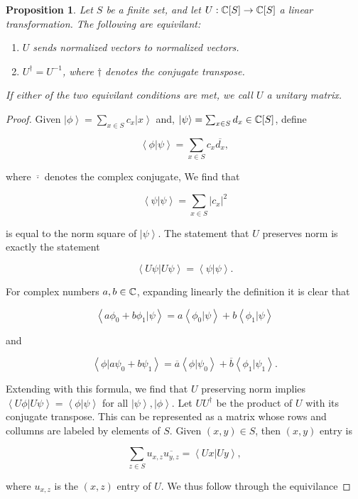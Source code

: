 \documentclass{article}
\newtheorem{proposition}{Proposition}[section]
\theoremstyle{definition}
\numberwithin{figure}{section}
\begin{document}
\begin{proposition}\label{unitary equivilance} Let $S$ be a finite set, and let $U: \mathbb{C}[S]\to \mathbb{C}[S]$ a linear transformation. The following are equivilant:

\begin{enumerate}
\item $U$ sends normalized vectors to normalized vectors.
\item $U^{\dagger}=U^{-1}$, where $\dagger$ denotes the conjugate transpose.
\end{enumerate}

If either of the two equivilant conditions are met, we call $U$ a unitary matrix.
\end{proposition}
\begin{proof} Given $\left|\phi\right>=\sum_{x\in S}c_x\left|x\right>$ and, $\left|\psi\right>=\sum_{x\in S}d_x\in \mathbb{C}[S]$, define

$$\left<\phi|\psi\right>=\sum_{x\in S}c_x\overline{d_x},$$

where $\overline{\cdot}$ denotes the complex conjugate, We find that

$$\left<\psi|\psi\right>=\sum_{x\in S}|c_x|^2$$

is equal to the norm square of $\left|\psi\right>$. The statement that $U$ preserves norm is exactly the statement

$$\left<U\psi|U\psi\right>=\left<\psi|\psi\right>.$$

For complex numbers $a,b\in \mathbb{C}$, expanding linearly the definition it is clear that

$$\left<a\phi_0+b\phi_1|\psi\right>=a\left<\phi_0|\psi\right>+b\left<\phi_1|\psi\right>$$

and

$$\left<\phi|a\psi_0+b\psi_1\right>=\overline{a}\left<\phi|\psi_0\right>+\overline{b}\left<\phi_1|\psi_1\right>.$$

Extending with this formula, we find that $U$ preserving norm implies $\left<U\phi|U\psi\right>=\left<\phi|\psi\right>$ for all $\left|\psi\right>,\left|\phi\right>$. Let $U U^{\dagger}$ be the product of $U$ with its conjugate transpose. This can be represented as a matrix whose rows and collumns are labeled by elements of $S$. Given $(x,y)\in S$, then $(x,y)$ entry is

$$\sum_{z\in S}u_{x,z}\overline{u_{y,z}}=\left<U x| U y\right>,$$

where $u_{x,z}$ is the $(x,z)$ entry of $U$. We thus follow through the equivilance


\end{proof}
\end{document}
